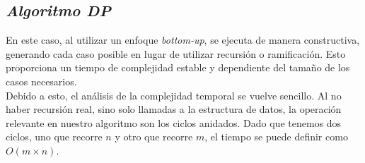 \subsection{\textit{\textbf{Algoritmo DP}}}
En este caso, al utilizar un enfoque \textit{bottom-up}, se ejecuta de manera constructiva, generando cada caso posible en lugar de utilizar recursión o ramificación. Esto proporciona un tiempo de complejidad estable y dependiente del tamaño de los casos necesarios.\\

Debido a esto, el análisis de la complejidad temporal se vuelve sencillo. Al no haber recursión real, sino solo llamadas a la estructura de datos, la operación relevante en nuestro algoritmo son los ciclos anidados. Dado que tenemos dos ciclos, uno que recorre \(n\)  y otro que recorre \(m\), el tiempo se puede definir como \(O(m \times n) \).